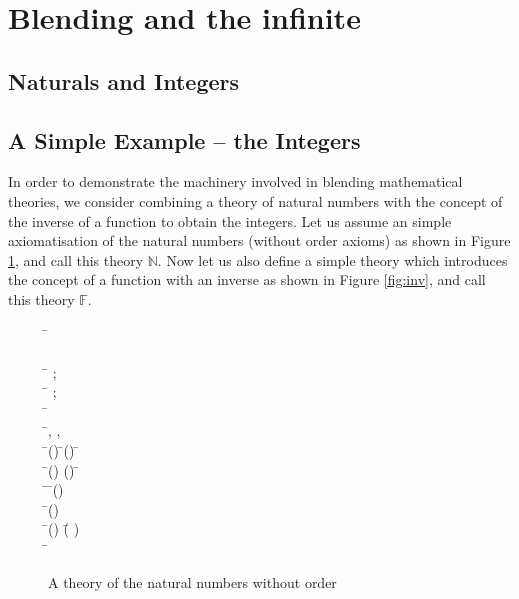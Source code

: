 \section{Blending and the infinite}
\label{sec:infinity}


\subsection{Naturals and Integers}

\subsection{A Simple Example -- the Integers}

In order to demonstrate the machinery involved in blending
mathematical theories, we consider combining a theory of natural
numbers with the concept of the inverse of a function to obtain the
integers. Let us assume an simple axiomatisation of the natural
numbers (without order axioms) as shown in Figure \ref{fig:nats}, and
call this theory $\mathbb{N}$. Now let us also define a simple theory
which introduces the concept of a function with an inverse as shown in
Figure \ref{fig:inv}, and call this theory $\mathbb{F}$. 
\begin{figure}[!ht]
\begin{hetcasl}
\SPEC \= \Ax{=}\\
\> \SORT {}\\
\> \OPS \= \Ax{:} ;\\
\>\>  \Ax{:} \= \Ax{\rightarrow} ;\\
\>\> \Ax{\_\_}\Ax{+}\Ax{\_\_} \Ax{:} \= \Ax{\times}  \Ax{\rightarrow} \\
\> \Ax{\forall} \=, ,  \Ax{:}  \\
\> \Ax{\bullet} \=() \Ax{=}  \Ax{\wedge} \=() \Ax{=}  \Ax{\Rightarrow} \= \Ax{=} \\
\> \Ax{\bullet} \=() \Ax{=} () \Ax{\Rightarrow} \= \Ax{=} \\
\> \Ax{\bullet} \=\Ax{\exists}  \Ax{:}  \Ax{\bullet} \=() \Ax{=} \\
\> \Ax{\bullet} \Ax{\neg} \=() \Ax{=} \\
\> \Ax{\bullet} \=() \Ax{+}  \Ax{=} (\= \Ax{+} )\\
\> \Ax{\bullet} \= \Ax{+}  \Ax{=} \\
\end{hetcasl}
\caption{A theory of the natural numbers without order}
\label{fig:nats}
\end{figure}

